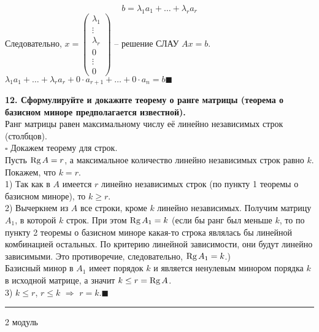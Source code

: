 \documentclass[11pt,a4paper]{article}
\newcommand{\Rg}[1]{\mathrm{Rg}\hspace{0.5mm}#1}
\newcommand{\proof}{$\square$ }
\newcommand{\qed}{\hfill$\blacksquare$}
\begin{document}
$$b = \lambda_1 a_1 + \hdots + \lambda_r a_r$$
Следовательно, $x =
\left( \begin{matrix}
\lambda_1 \\
\vdots \\
\lambda_r \\
0 \\
\vdots \\
0
\end{matrix} \right)$ -- решение СЛАУ $Ax = b$.\\
$\lambda_1 a_1 + \hdots + \lambda_r a_r + 0 \cdot a_{r+1} + \hdots + 0 \cdot a_n = b$\qed

\textbf{12. Сформулируйте и докажите теорему о ранге матрицы (теорема о базисном миноре предполагается известной).\\}
Ранг матрицы равен максимальному числу её линейно независимых строк (столбцов).\\
\proof Докажем теорему для строк.\\
Пусть $\Rg{A} = r$, а максимальное количество линейно независимых строк равно $k$. Покажем, что $k = r$.\\
1) Так как в $A$ имеется $r$ линейно независимых строк (по пункту 1 теоремы о базисном миноре), то $k \geq r$.\\
2) Вычеркнем из $A$ все строки, кроме $k$ линейно независимых. Получим матрицу $A_1$, в которой $k$ строк. При этом $\Rg{A_1} = k$ (если бы ранг был меньше $k$, то по пункту 2 теоремы о базисном миноре какая-то строка являлась бы линейной комбинацией остальных. По критерию линейной зависимости, они будут линейно зависимыми. Это противоречие, следовательно, $\Rg{A_1} = k$.)\\
Базисный минор в $A_1$ имеет порядок $k$ и является ненулевым минором порядка $k$ в исходной матрице, а значит $k \leq r = \Rg{A}$.\\
3) $k \leq r$, $r \leq k$ $\Rightarrow$ $r = k$.\qed

\rule{\linewidth}{0.3mm}

\vspace{1mm}
\begin{center}
\begin{LARGE}
\textsf{2 модуль}
\end{LARGE}
\end{center}
\vspace{1mm}
\end{document}
